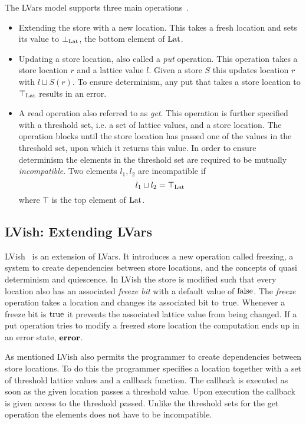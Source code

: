 The LVars model supports three main operations~\parencite{kuper2013lvars}.
\begin{itemize}
  \item Extending the store with a new location. This takes a fresh location and
    sets its value to $\bot_{\mathrm{Lat}}$, the bottom element of $\mathrm{Lat}$.
  \item Updating a store location, also called a \emph{put} operation. This
    operation takes a store location $r$ and a lattice value $l$. Given a store
    $S$ this updates location $r$ with $l \sqcup S(r)$. To ensure determinism,
    any put that takes a store location to $\top_{\mathrm{Lat}}$ results in an
    error.
  \item A read operation also referred to as \emph{get}. This operation is
    further specified with a threshold set, i.e. a set of lattice values, and a
    store location. The operation blocks until the store location has passed one
    of the values in the threshold set, upon which it returns this value. In
    order to ensure determinism the elements in the threshold set are required
    to be mutually \emph{incompatible}. Two elements $l_1, l_2$ are incompatible if
    \begin{equation*}
      l_1 \sqcup l_2 = \top_{\mathrm{Lat}}
    \end{equation*}
    where $\top$ is the top element of $\mathrm{Lat}$.
\end{itemize}

\subsection{LVish: Extending LVars}%
\label{sub:lvish_extending_lvars}

LVish~\parencite{kuper2014freeze} is an extension of LVars. It introduces a new
operation called freezing, a system to create dependencies between store
locations, and the concepts of quasi determinism and quiescence.  In LVish the
store is modified such that every location also has an associated \emph{freeze
bit} with a default value of $\mathrm{false}$. The \emph{freeze} operation
takes a location and changes its associated bit to $\mathrm{true}$.  Whenever a
freeze bit is $\mathrm{true}$ it prevents the associated lattice value from being
changed. If a put operation tries to modify a freezed store location the
computation ends up in an error state, $\mbox{{\bf error}}$.

As mentioned LVish also permits the programmer to create dependencies between
store locations. To do this the programmer specifies a location together with a
set of threshold lattice values and a callback function. The callback is
executed as soon as the given location passes a threshold value. Upon execution
the callback is given access to the threshold passed. Unlike the threshold sets
for the get operation the elements does not have to be incompatible. 

